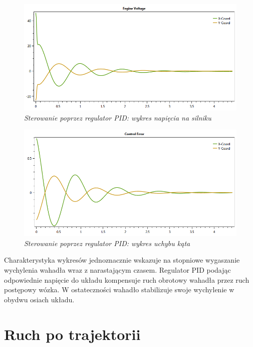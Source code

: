 \documentclass[12pt, oneside]{report}
\theoremstyle{definition}
\begin{document}
\begin{figure}[H]
	\centering
		\includegraphics[width = 350pt]{PIDEV} 
		\caption{\textit{Sterowanie poprzez regulator PID: wykres napięcia na silniku}}
		\label{plot:PIDEV}
\end{figure}

\begin{figure}[H]
	\centering
		\includegraphics[width = 350pt]{PIDCE} 
		\caption{\textit{Sterowanie poprzez regulator PID: wykres uchybu kąta}}
		\label{plot:PIDCE}
\end{figure}

Charakterystyka wykresów jednoznacznie wskazuje na stopniowe wygaszanie wychylenia wahadła wraz z narastającym czasem. Regulator PID podając odpowiednie napięcie do układu kompensuje ruch obrotowy wahadła przez ruch postępowy wózka. W ostateczności wahadło stabilizuje swoje wychylenie w obydwu osiach układu.

\section{Ruch po trajektorii}
\end{document}
